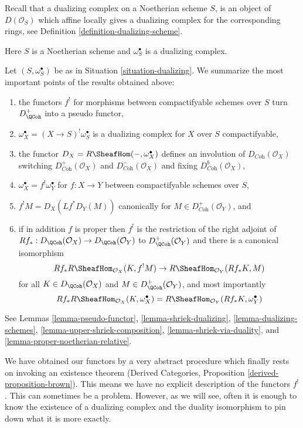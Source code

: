 \medskip\noindent
Recall that a dualizing complex on a Noetherian scheme $S$, is an
object of $D(\mathcal{O}_S)$ which affine locally gives a dualizing
complex for the corresponding rings, see
Definition \ref{definition-dualizing-scheme}.

\begin{situation}
\label{situation-dualizing}
Here $S$ is a Noetherian scheme and $\omega_S^\bullet$ is a dualizing
complex.
\end{situation}

\noindent
Let $(S, \omega_S^\bullet)$ be as in Situation \ref{situation-dualizing}.
We summarize the most important points of the results obtained above:
\begin{enumerate}
\item the functors $f^!$ for morphisms between compactifyable
schemes over $S$ turn $D_\QCoh^+$ into a pseudo functor,
\item $\omega_X^\bullet = (X \to S)^!\omega_S^\bullet$
is a dualizing complex for $X$ over $S$ compactifyable,
\item the functor $D_X = R\SheafHom(-, \omega_X^\bullet)$
defines an involution of $D_{\textit{Coh}}(\mathcal{O}_X)$
switching $D_{\textit{Coh}}^+(\mathcal{O}_X)$ and
$D_{\textit{Coh}}^-(\mathcal{O}_X)$ and fixing
$D_{\textit{Coh}}^b(\mathcal{O}_X)$,
\item $\omega_X^\bullet = f^!\omega_Y^\bullet$ for $f : X \to Y$
between compactifyable schemes over $S$,
\item $f^!M = D_X(Lf^*D_Y(M))$ canonically for
$M \in D_{\textit{Coh}}^+(\mathcal{O}_Y)$, and
\item if in addition $f$ is proper then $f^!$ is the restriction
of the right adjoint of
$Rf_* : D_\QCoh(\mathcal{O}_X) \to D_\QCoh(\mathcal{O}_Y)$
to $D_\QCoh^+(\mathcal{O}_Y)$ and there is a canonical isomorphism
$$
Rf_*R\SheafHom_{\mathcal{O}_X}(K, f^!M)
\to
R\SheafHom_{\mathcal{O}_Y}(Rf_*K, M)
$$
for all $K \in D_\QCoh(\mathcal{O}_X)$ and $M \in D_\QCoh^+(\mathcal{O}_Y)$,
and most importantly
$$
Rf_*R\SheafHom_{\mathcal{O}_X}(K, \omega_X^\bullet) =
R\SheafHom_{\mathcal{O}_Y}(Rf_*K, \omega_Y^\bullet)
$$
\end{enumerate}
See Lemmas
\ref{lemma-pseudo-functor},
\ref{lemma-shriek-dualizing},
\ref{lemma-dualizing-schemes},
\ref{lemma-upper-shriek-composition},
\ref{lemma-shriek-via-duality}, and
\ref{lemma-proper-noetherian-relative}. 

\medskip\noindent
We have obtained our functors by a very abstract procedure
which finally rests on invoking an existence theorem
(Derived Categories, Proposition \ref{derived-proposition-brown}).
This means we have no explicit description of the functors $f^!$.
This can sometimes be a problem. However, as we will see,
often it is enough to know the existence of a dualizing complex
and the duality isomorphism to pin down what it is more exactly.






